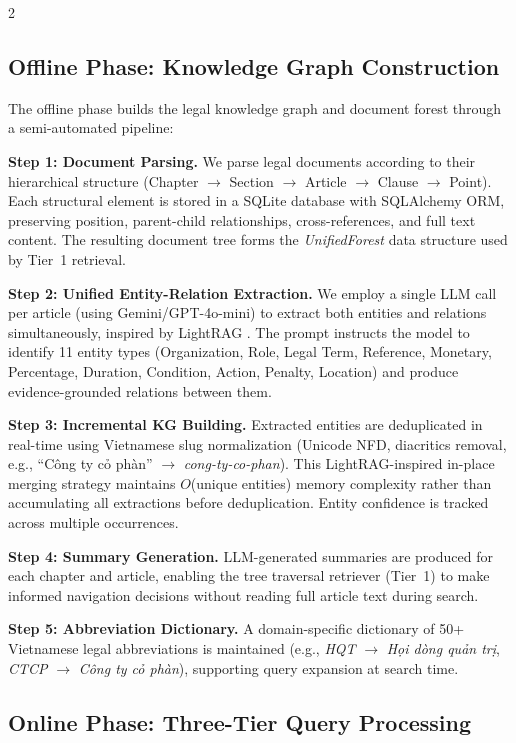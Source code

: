\documentclass[11pt,a4paper]{article}
\begin{document}
\begin{multicols}{2}
\subsection{Offline Phase: Knowledge Graph Construction}

The offline phase builds the legal knowledge graph and document forest through a semi-automated pipeline:

\textbf{Step 1: Document Parsing.} We parse legal documents according to their hierarchical structure (Chapter $\rightarrow$ Section $\rightarrow$ Article $\rightarrow$ Clause $\rightarrow$ Point). Each structural element is stored in a SQLite database with SQLAlchemy ORM, preserving position, parent-child relationships, cross-references, and full text content. The resulting document tree forms the \textit{UnifiedForest} data structure used by Tier~1 retrieval.

\textbf{Step 2: Unified Entity-Relation Extraction.} We employ a single LLM call per article (using Gemini/GPT-4o-mini) to extract both entities and relations simultaneously, inspired by LightRAG \cite{ref5}. The prompt instructs the model to identify 11 entity types (Organization, Role, Legal Term, Reference, Monetary, Percentage, Duration, Condition, Action, Penalty, Location) and produce evidence-grounded relations between them.

\textbf{Step 3: Incremental KG Building.} Extracted entities are deduplicated in real-time using Vietnamese slug normalization (Unicode NFD, diacritics removal, e.g., ``C\^ong ty c\h{o} ph\`an'' $\rightarrow$ \textit{cong-ty-co-phan}). This LightRAG-inspired in-place merging strategy maintains $O$(unique entities) memory complexity rather than accumulating all extractions before deduplication. Entity confidence is tracked across multiple occurrences.

\textbf{Step 4: Summary Generation.} LLM-generated summaries are produced for each chapter and article, enabling the tree traversal retriever (Tier~1) to make informed navigation decisions without reading full article text during search.

\textbf{Step 5: Abbreviation Dictionary.} A domain-specific dictionary of 50+ Vietnamese legal abbreviations is maintained (e.g., \textit{H\DJ QT} $\rightarrow$ \textit{H\d{o}i d\`{o}ng qu\h{a}n tr\d{i}}, \textit{CTCP} $\rightarrow$ \textit{C\^{o}ng ty c\h{o} ph\`{a}n}), supporting query expansion at search time.

\subsection{Online Phase: Three-Tier Query Processing}


\end{multicols}
\end{document}
